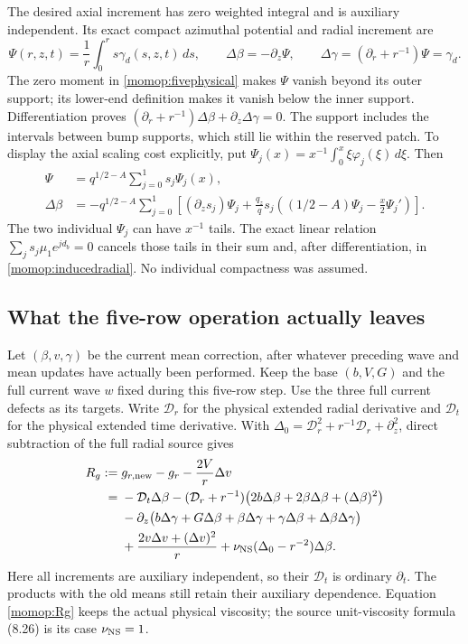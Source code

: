 \documentclass[11pt]{article}
\begin{document}
The desired axial increment has zero weighted integral and is
auxiliary independent. Its exact compact azimuthal potential and
radial increment are
\[
 \Psi(r,z,t)=\frac1r\int_0^r s\gamma_d(s,z,t)\,ds,\qquad
 \Delta\beta=-\partial_z\Psi,\qquad
 \Delta\gamma=(\partial_r+r^{-1})\Psi=\gamma_d.
\]
The zero moment in \eqref{momop:fivephysical} makes $\Psi$ vanish
beyond its outer support; its lower-end definition makes it vanish
below the inner support. Differentiation proves
$(\partial_r+r^{-1})\Delta\beta+\partial_z\Delta\gamma=0$.
The support includes the intervals between bump supports, which still
lie within the reserved patch.
To display the axial scaling cost explicitly, put
$\Psi_j(x)=x^{-1}\int_0^x \xi\varphi_j(\xi)\,d\xi$. Then
\begin{align}
 \Psi&=q^{1/2-A}\sum_{j=0}^1s_j\Psi_j(x),\nonumber\\
 \Delta\beta
 &=-q^{1/2-A}\sum_{j=0}^1\left[
    (\partial_zs_j)\Psi_j+
    \frac{q_z}{q}s_j\left((1/2-A)\Psi_j
                                      -\frac x2\Psi_j'\right)\right].
 \label{momop:inducedradial}
\end{align}
The two individual $\Psi_j$ can have $x^{-1}$ tails. The exact
linear relation $\sum_js_j\mu_1e^{jd_b}=0$ cancels those tails
in their sum and, after differentiation, in \eqref{momop:inducedradial}.
No individual compactness was assumed.

\subsection{What the five-row operation actually leaves}

Let $(\beta,v,\gamma)$ be the current mean correction, after whatever
preceding wave and mean updates have actually been performed. Keep the
base $(b,V,G)$ and the full current wave $w$ fixed during this
five-row step. Use the three full current defects as its targets.
Write $\mathcal D_r$ for the physical extended radial derivative and
$\mathcal D_t$ for the physical extended time derivative. With
$\Delta_0=\mathcal D_r^2+r^{-1}\mathcal D_r+\partial_z^2$, direct
subtraction of the full radial source gives
\begin{align}
 R_g:={}&g_{r,\rm new}-g_r-\frac{2V}{r}\Delta v\nonumber\\
 ={}&-\mathcal D_t\Delta\beta
 -(\mathcal D_r+r^{-1})
             \bigl(2b\Delta\beta+2\beta\Delta\beta+(\Delta\beta)^2\bigr)
 \nonumber\\
 &-\partial_z\bigl(b\Delta\gamma+G\Delta\beta+
           \beta\Delta\gamma+\gamma\Delta\beta+\Delta\beta\Delta\gamma\bigr)
 \nonumber\\
 &+\frac{2v\Delta v+(\Delta v)^2}{r}
               +\nu_{\rm NS}(\Delta_0-r^{-2})\Delta\beta .
 \label{momop:Rg}
\end{align}
Here all increments are auxiliary independent, so their
$\mathcal D_t$ is ordinary $\partial_t$. The products with the
old means still retain their auxiliary dependence. Equation
\eqref{momop:Rg} keeps the actual physical viscosity; the source
unit-viscosity formula (8.26) is its case $\nu_{\rm NS}=1$.
\end{document}

